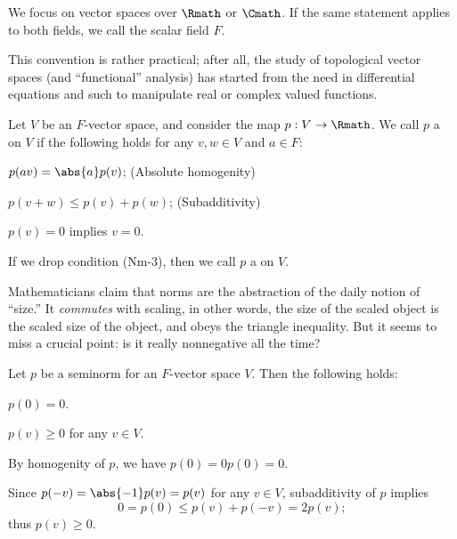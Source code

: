 \label{sec:norm}

\begin{convention}
    \label{cnv:tvsfields}
    We focus on vector spaces over \(\Rmath\) or \(\Cmath\).
    If the same statement applies to both fields,
    we call the scalar field \(F\).
\end{convention}

This convention is rather practical;
after all, the study of topological vector spaces
(and ``functional'' analysis)
has started from the need in differential equations and such
to manipulate real or complex valued functions.

\begin{definition}
    \label{def:norm}
    Let \(V\) be an \(F\)-vector space,
    and consider the map \(p:V\to\Rmath\).
    We call \(p\) a  on \(V\)
    if the following holds for any \(v,w\in V\) and \(a\in F\):
    \begin{axioms}[Nm]
        \item \(p(av)=\abs{a}p(v)\);
        \hfill (Absolute homogenity)
        \item \(p(v+w)\le p(v)+p(w)\);
        \hfill (Subadditivity)
        \item \(p(v)=0\) implies \(v=0\).
    \end{axioms}
    If we drop condition (Nm-3),
    then we call \(p\) a  on \(V\).
\end{definition}

Mathematicians claim that
norms are the abstraction of the daily notion of ``size.''
It \emph{commutes} with scaling,
in other words,
the size of the scaled object is the scaled size of the object,
and obeys the triangle inequality.
But it seems to miss a crucial point:
is it really nonnegative all the time?

\begin{observation}
    \label{obv:seminorm}
    Let \(p\) be a seminorm for an \(F\)-vector space \(V\).
    Then the following holds:
    \begin{alist}
        \item \(p(0)=0\).
        \item \(p(v)\ge 0\) for any \(v\in V\).
    \end{alist}
\end{observation}
\begin{myproof}
    \begin{alist}
        \item By homogenity of \(p\), we have \(p(0)=0p(0)=0\).
        \item Since \(p(-v)=\abs{-1}p(v)=p(v)\) for any \(v\in V\),
        subadditivity of \(p\) implies
        \[
            0
            =p(0)
            \le p(v)+p(-v)
            =2p(v);
        \]
        thus \(p(v)\ge 0\).
        \rightqed
    \end{alist}
\end{myproof}

